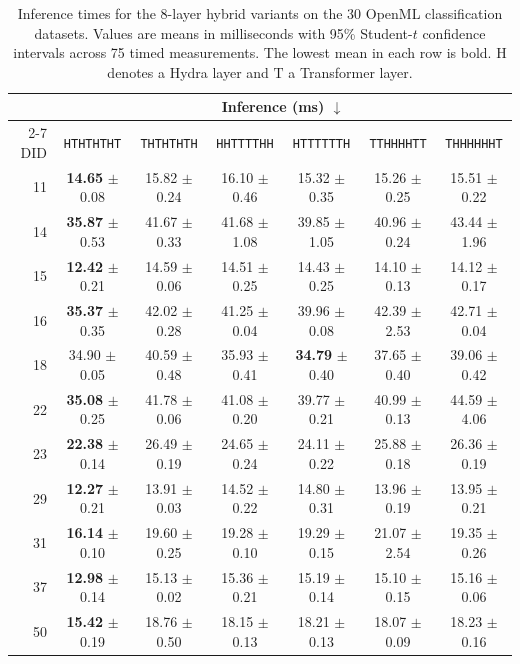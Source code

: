 \begin{table}[t]
\centering
\caption{Inference times for the 8-layer hybrid variants on the 30 OpenML classification datasets. Values are means in milliseconds with 95\% Student-$t$ confidence intervals across 75 timed measurements. The lowest mean in each row is bold. $\mathrm{H}$ denotes a Hydra layer and $\mathrm{T}$ a Transformer layer.}
\label{tab:hybrid_variants_inference}
\setlength{\tabcolsep}{4pt}
\renewcommand{\arraystretch}{1.04}
\scriptsize
\begin{tabular*}{\textwidth}{@{\extracolsep{\fill}}rcccccc@{}}
\toprule
& \multicolumn{6}{c}{Inference (ms) $\downarrow$} \\
\cmidrule(lr){2-7}
DID & \texttt{HTHTHTHT} & \texttt{THTHTHTH} & \texttt{HHTTTTHH} & \texttt{HTTTTTTH} & \texttt{TTHHHHTT} & \texttt{THHHHHHT} \\
\midrule
11 & \textbf{14.65} $\pm$ 0.08 & 15.82 $\pm$ 0.24 & 16.10 $\pm$ 0.46 & 15.32 $\pm$ 0.35 & 15.26 $\pm$ 0.25 & 15.51 $\pm$ 0.22 \\
14 & \textbf{35.87} $\pm$ 0.53 & 41.67 $\pm$ 0.33 & 41.68 $\pm$ 1.08 & 39.85 $\pm$ 1.05 & 40.96 $\pm$ 0.24 & 43.44 $\pm$ 1.96 \\
15 & \textbf{12.42} $\pm$ 0.21 & 14.59 $\pm$ 0.06 & 14.51 $\pm$ 0.25 & 14.43 $\pm$ 0.25 & 14.10 $\pm$ 0.13 & 14.12 $\pm$ 0.17 \\
16 & \textbf{35.37} $\pm$ 0.35 & 42.02 $\pm$ 0.28 & 41.25 $\pm$ 0.04 & 39.96 $\pm$ 0.08 & 42.39 $\pm$ 2.53 & 42.71 $\pm$ 0.04 \\
18 & 34.90 $\pm$ 0.05 & 40.59 $\pm$ 0.48 & 35.93 $\pm$ 0.41 & \textbf{34.79} $\pm$ 0.40 & 37.65 $\pm$ 0.40 & 39.06 $\pm$ 0.42 \\
22 & \textbf{35.08} $\pm$ 0.25 & 41.78 $\pm$ 0.06 & 41.08 $\pm$ 0.20 & 39.77 $\pm$ 0.21 & 40.99 $\pm$ 0.13 & 44.59 $\pm$ 4.06 \\
23 & \textbf{22.38} $\pm$ 0.14 & 26.49 $\pm$ 0.19 & 24.65 $\pm$ 0.24 & 24.11 $\pm$ 0.22 & 25.88 $\pm$ 0.18 & 26.36 $\pm$ 0.19 \\
29 & \textbf{12.27} $\pm$ 0.21 & 13.91 $\pm$ 0.03 & 14.52 $\pm$ 0.22 & 14.80 $\pm$ 0.31 & 13.96 $\pm$ 0.19 & 13.95 $\pm$ 0.21 \\
31 & \textbf{16.14} $\pm$ 0.10 & 19.60 $\pm$ 0.25 & 19.28 $\pm$ 0.10 & 19.29 $\pm$ 0.15 & 21.07 $\pm$ 2.54 & 19.35 $\pm$ 0.26 \\
37 & \textbf{12.98} $\pm$ 0.14 & 15.13 $\pm$ 0.02 & 15.36 $\pm$ 0.21 & 15.19 $\pm$ 0.14 & 15.10 $\pm$ 0.15 & 15.16 $\pm$ 0.06 \\
50 & \textbf{15.42} $\pm$ 0.19 & 18.76 $\pm$ 0.50 & 18.15 $\pm$ 0.13 & 18.21 $\pm$ 0.13 & 18.07 $\pm$ 0.09 & 18.23 $\pm$ 0.16 \\

\end{tabular*}
\end{table}

